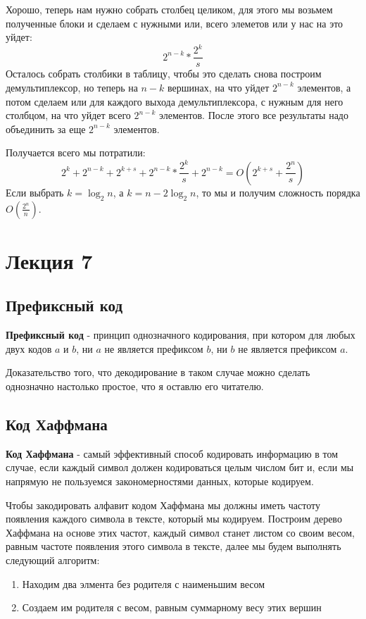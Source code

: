 \documentclass{article}
\begin{document}
Хорошо, теперь нам нужно собрать столбец целиком, для этого мы возьмем полученные блоки и сделаем с нужными или, всего элеметов или у нас на это уйдет: $$2^{n-k}*\frac{2^k}{s}$$
Осталось собрать столбики в таблицу, чтобы это сделать снова построим демультиплексор, но теперь на $n-k$ вершинах, на что уйдет $2^{n-k}$ элементов, а потом сделаем или для каждого выхода демультиплексора, с нужным для него столбцом, на что уйдет всего $2^{n-k}$ элементов. После этого все результаты надо объединить за еще $2^{n-k}$ элементов.

Получается всего мы потратили: $$2^k+2^{n-k}+2^{k+s}+2^{n-k}*\frac{2^k}{s}+2^{n-k}=O(2^{k+s}+\frac{2^n}{s})$$
Если выбрать $k=\log_2n$, а $k=n-2\log_2n$, то мы и получим сложность порядка $O(\frac{2^n}{n})$.
\section{Лекция 7}
\subsection{Префиксный код}
\textbf{Префиксный код} - принцип однозначного кодирования, при котором для любых двух кодов $a$ и $b$, ни $a$ не является префиксом $b$, ни $b$ не является префиксом $a$.

Доказательство того, что декодирование в таком случае можно сделать однозначно настолько простое, что я оставлю его читателю. 

\subsection{Код Хаффмана}
\textbf{Код Хаффмана} - самый эффективный способ кодировать информацию в том случае, если каждый символ должен кодироваться целым числом бит и, если мы напрямую не пользуемся закономерностями данных, которые кодируем. 

Чтобы закодировать алфавит кодом Хаффмана мы должны иметь частоту появления каждого символа в тексте, который мы кодируем. Построим дерево Хаффмана на основе этих частот, каждый символ станет листом со своим весом, равным частоте появления этого символа в тексте, далее мы будем выполнять следующий алгоритм:
\begin{enumerate}
    \item Находим два элмента без родителя с наименьшим весом
    \item Создаем им родителя с весом, равным суммарному весу этих вершин
\end{enumerate}
\end{document}
